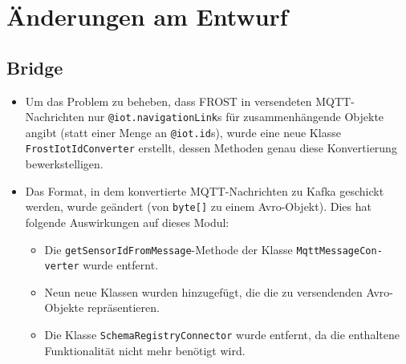 \chapter{Änderungen am Entwurf}
\section{Bridge}
\begin{itemize}
	\item Um das Problem zu beheben, dass FROST in versendeten MQTT-Nachrichten nur \texttt{@iot.navigationLink}s für zusammenhängende Objekte angibt (statt einer Menge an \texttt{@iot.id}s), wurde eine neue Klasse \texttt{FrostIotIdConverter} erstellt, dessen Methoden genau diese Konvertierung bewerkstelligen.
	\item Das Format, in dem konvertierte MQTT-Nachrichten zu Kafka geschickt werden, wurde geändert (von \texttt{byte[]} zu einem Avro-Objekt). Dies hat folgende Auswirkungen auf dieses Modul:
	\begin{itemize}
		\item Die \texttt{getSensorIdFromMessage}-Methode der Klasse \texttt{MqttMessageCon-\\verter} wurde entfernt.
		\item Neun neue Klassen wurden hinzugefügt, die die zu versendenden Avro-Objekte repräsentieren.
		\item Die Klasse \texttt{SchemaRegistryConnector} wurde entfernt, da die enthaltene Funktionalität nicht mehr benötigt wird.
	\end{itemize}
\end{itemize}
